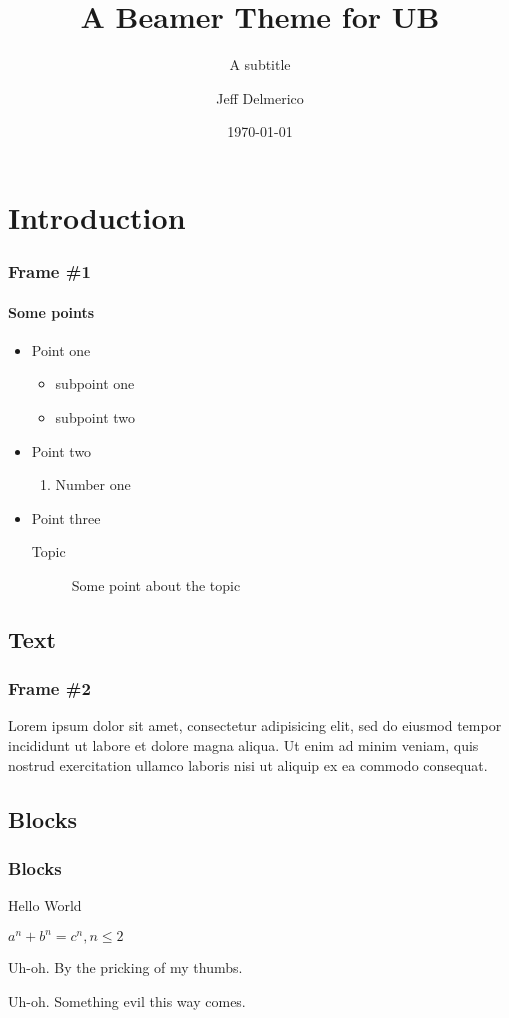 \documentclass{beamer}
\title{A Beamer Theme for UB}
\subtitle{A subtitle}
\author{Jeff Delmerico}
\date{\today}
\institute{\url{jad12@buffalo.edu}}
\begin{document}
\begin{frame}[plain]
\titlepage
\end{frame}


\section{Introduction}
\begin{frame}
\frametitle{Frame \#1}
\framesubtitle{Some points}
\begin{itemize}
\item Point one
	\begin{itemize}
	\item subpoint one
	\item subpoint two
	\end{itemize}
\item Point two
	\begin{enumerate}
	\item Number one
	\end{enumerate}
\item Point three
	\begin{description}
	\item[Topic] Some point about the topic 
	\end{description}
\end{itemize}
\end{frame}

\subsection{Text}
\begin{frame}
\frametitle{Frame \#2}
Lorem ipsum dolor sit amet, consectetur adipisicing elit, sed do eiusmod tempor incididunt ut labore et dolore magna aliqua. Ut enim ad minim veniam, quis nostrud exercitation ullamco laboris nisi ut aliquip ex ea commodo consequat.
\end{frame}

\subsection{Blocks}
\begin{frame}
\frametitle{Blocks}
\begin{definition}[Greetings]
Hello World
\end{definition}

\begin{theorem}
$a^n + b^n = c^n, n \leq 2$
\end{theorem}

\begin{alertblock}{Uh-oh.}
By the pricking of my thumbs.
\end{alertblock}

\begin{exampleblock}{Uh-oh.}
Something evil this way comes.
\end{exampleblock}

\end{frame}
\end{document}
